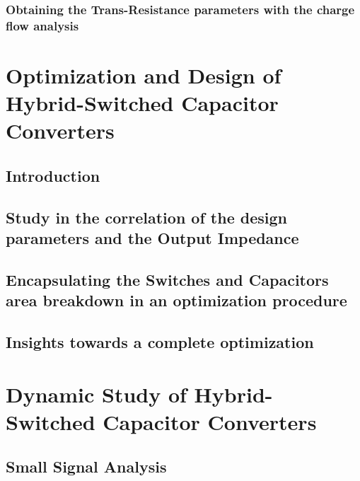 \subsection{Obtaining the Trans-Resistance parameters with the charge flow analysis }



\chapter[Optimization and Design]{Optimization and Design of Hybrid-Switched Capacitor Converters}
\section{Introduction}
\section{Study in the correlation of the design parameters and the Output Impedance}
\section{Encapsulating the Switches and Capacitors area breakdown in an optimization procedure}
\section{Insights towards a complete optimization}

\chapter[Dynamic Study]{Dynamic Study of Hybrid-Switched Capacitor Converters}
\section{Small Signal Analysis}


\clearpage

 